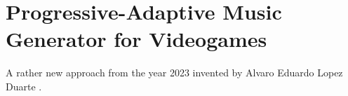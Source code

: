 \section{Progressive-Adaptive Music Generator for Videogames}
A rather new approach from the year 2023 invented by Alvaro Eduardo Lopez
Duarte \cite{lopez2023progressive}.
